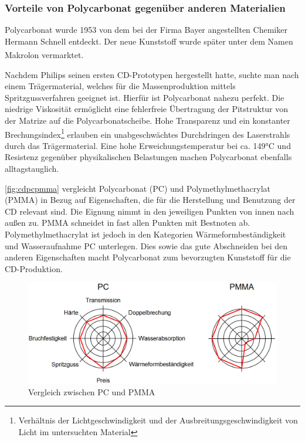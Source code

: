 \subsubsection{Vorteile von Polycarbonat gegenüber anderen Materialien}

Polycarbonat wurde 1953 von dem bei der Firma Bayer angestellten Chemiker
Hermann Schnell entdeckt. Der neue Kunststoff wurde später unter dem Namen
Makrolon\textsuperscript{\textregistered} vermarktet. \cite{cuzpc}

Nachdem Philips seinen ersten CD-Prototypen hergestellt hatte, suchte man nach
einem Trägermaterial, welches für die Massenproduktion mittels
Spritzgussverfahren geeignet ist. Hierfür ist Polycarbonat nahezu perfekt. Die
niedrige Viskosität ermöglicht eine fehlerfreie Übertragung der Pitstruktur von
der Matrize auf die Polycarbonatscheibe. Hohe Transparenz und ein konstanter
Brechungsindex\footnote{Verhältnis der Lichtgeschwindigkeit und der
Ausbreitungsgeschwindigkeit von Licht im untersuchten Material} erlauben ein
unabgeschwächtes Durchdringen des Laserstrahls durch das Trägermaterial. Eine
hohe Erweichungstemperatur bei ca. 149°C\cite{cuzpc2} und Resistenz gegenüber
physikalischen Belastungen machen Polycarbonat ebenfalls alltagstauglich.
\cite{cfcd}

\autoref{fig:cdpcpmma} vergleicht Polycarbonat (PC) und Polymethylmethacrylat
(PMMA) in Bezug auf Eigenschaften, die für die Herstellung und Benutzung der CD
relevant sind. Die Eignung nimmt in den jeweiligen Punkten von innen nach außen
zu. PMMA schneidet in fast allen Punkten mit Bestnoten ab. Polymethylmethacrylat
ist jedoch in den Kategorien Wärmeformbeständigkeit und Wasseraufnahme PC
unterlegen. Dies sowie das gute Abschneiden bei den anderen Eigenschaften macht
Polycarbonat zum bevorzugten Kunststoff für die CD-Produktion.

\begin{figure}[h]
    \begin{center}
        \begin{minipage}[t]{\textwidth}
            \begin{center}
                \includegraphics[height=0.1\textheight]{Bilder/Optische_Datentraeger_Die_Compact_Disc/Material_Polycarbonat/cdpcpmma.png}
                \caption[Vergleich zwischen PC und PMMA \newline Roth, Klaus: CD, DVD \& Co.: Die Chemie der schillernden Scheiben, in: Chemie in unserer Zeit (41/2007), S. 337]{Vergleich zwischen PC und PMMA}
                \label{fig:cdpcpmma}
            \end{center}
        \end{minipage}
    \end{center}
\end{figure}
